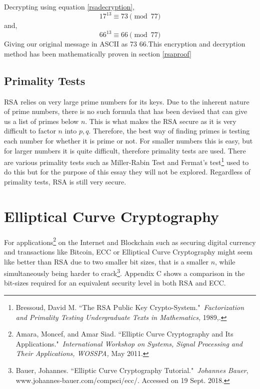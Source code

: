 \documentclass[a4paper,12pt]{article}
\theoremstyle{definition}
\begin{document}
Decrypting using equation \ref{rsadecryption},
\begin{equation*}
	17^{13} \equiv 73 \pmod{77}
\end{equation*}
and,
\begin{equation*}
	66^{13} \equiv 66 \pmod{77}
\end{equation*}
Giving our original message in ASCII  as 73 66.This encryption and decryption method has been mathematically proven in section \ref{rsaproof}

\subsection{Primality Tests} \label{primalitytests}
RSA relies on very large prime numbers for its keys. Due to the inherent nature of prime numbers, there is no such formula that has been devised that can give us a list of primes below $n$. This is what makes the RSA secure as it is very difficult to factor $n$ into $p,q$. Therefore, the best way of finding primes is testing each number for whether it is prime or not. For smaller numbers this is easy, but for larger numbers it is quite difficult, therefore primality tests are used. There are various primality tests such as Miller-Rabin Test and Fermat's test\footnote{Bressoud, David M. ``The RSA Public Key Crypto-System." \textit{Factorization and Primality Testing Undergraduate Texts in Mathematics,} 1989,.} used to do this but for the purpose of this essay they will not be explored. Regardless of primality tests, RSA is still very secure.


\newpage
\section{Elliptical Curve Cryptography}
For applications\footnote{Amara, Moncef, and Amar Siad. ``Elliptic Curve Cryptography and Its Applications." \textit{International Workshop on Systems, Signal Processing and Their Applications, WOSSPA,} May 2011.} on the Internet and Blockchain such as securing digital currency and transactions like Bitcoin, ECC or Elliptical Curve Cryptography might seem like better than RSA  due to two smaller bit sizes, that is a smaller $n$, while simultaneously being harder to crack\footnote{Bauer, Johannes. ``Elliptic Curve Cryptography Tutorial." \textit{Johannes Bauer}, www.johannes-bauer.com/compsci/ecc/. Accessed on 19 Sept. 2018.}. Appendix C shows a comparison in the bit-sizes required for an equivalent security level in both RSA and ECC.
\end{document}
